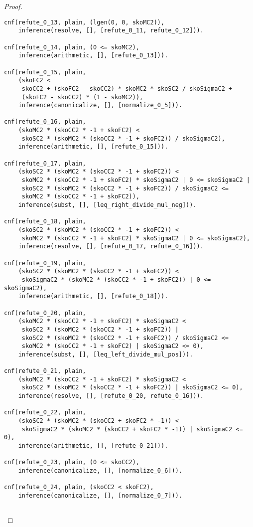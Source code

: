 \begin{proof}
\begin{verbatim}
cnf(refute_0_13, plain, (lgen(0, 0, skoMC2)),
    inference(resolve, [], [refute_0_11, refute_0_12])).

cnf(refute_0_14, plain, (0 <= skoMC2),
    inference(arithmetic, [], [refute_0_13])).

cnf(refute_0_15, plain,
    (skoFC2 <
     skoCC2 + (skoFC2 - skoCC2) * skoMC2 * skoSC2 / skoSigmaC2 +
     (skoFC2 - skoCC2) * (1 - skoMC2)),
    inference(canonicalize, [], [normalize_0_5])).

cnf(refute_0_16, plain,
    (skoMC2 * (skoCC2 * -1 + skoFC2) <
     skoSC2 * (skoMC2 * (skoCC2 * -1 + skoFC2)) / skoSigmaC2),
    inference(arithmetic, [], [refute_0_15])).

cnf(refute_0_17, plain,
    (skoSC2 * (skoMC2 * (skoCC2 * -1 + skoFC2)) <
     skoMC2 * (skoCC2 * -1 + skoFC2) * skoSigmaC2 | 0 <= skoSigmaC2 |
     skoSC2 * (skoMC2 * (skoCC2 * -1 + skoFC2)) / skoSigmaC2 <=
     skoMC2 * (skoCC2 * -1 + skoFC2)),
    inference(subst, [], [leq_right_divide_mul_neg])).

cnf(refute_0_18, plain,
    (skoSC2 * (skoMC2 * (skoCC2 * -1 + skoFC2)) <
     skoMC2 * (skoCC2 * -1 + skoFC2) * skoSigmaC2 | 0 <= skoSigmaC2),
    inference(resolve, [], [refute_0_17, refute_0_16])).

cnf(refute_0_19, plain,
    (skoSC2 * (skoMC2 * (skoCC2 * -1 + skoFC2)) <
     skoSigmaC2 * (skoMC2 * (skoCC2 * -1 + skoFC2)) | 0 <= skoSigmaC2),
    inference(arithmetic, [], [refute_0_18])).

cnf(refute_0_20, plain,
    (skoMC2 * (skoCC2 * -1 + skoFC2) * skoSigmaC2 <
     skoSC2 * (skoMC2 * (skoCC2 * -1 + skoFC2)) |
     skoSC2 * (skoMC2 * (skoCC2 * -1 + skoFC2)) / skoSigmaC2 <=
     skoMC2 * (skoCC2 * -1 + skoFC2) | skoSigmaC2 <= 0),
    inference(subst, [], [leq_left_divide_mul_pos])).

cnf(refute_0_21, plain,
    (skoMC2 * (skoCC2 * -1 + skoFC2) * skoSigmaC2 <
     skoSC2 * (skoMC2 * (skoCC2 * -1 + skoFC2)) | skoSigmaC2 <= 0),
    inference(resolve, [], [refute_0_20, refute_0_16])).

cnf(refute_0_22, plain,
    (skoSC2 * (skoMC2 * (skoCC2 + skoFC2 * -1)) <
     skoSigmaC2 * (skoMC2 * (skoCC2 + skoFC2 * -1)) | skoSigmaC2 <= 0),
    inference(arithmetic, [], [refute_0_21])).

cnf(refute_0_23, plain, (0 <= skoCC2),
    inference(canonicalize, [], [normalize_0_6])).

cnf(refute_0_24, plain, (skoCC2 < skoFC2),
    inference(canonicalize, [], [normalize_0_7])).


\end{verbatim}
\end{proof}
